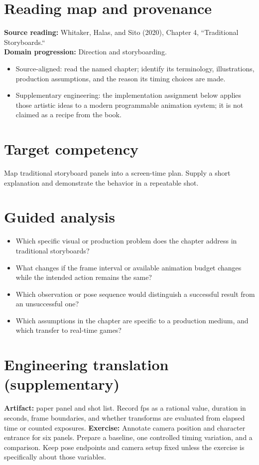 \documentclass[10pt,letterpaper]{article}
\begin{document}
\makedoctitle
\makedocsummary

\section{Reading map and provenance}
\textbf{Source reading:} Whitaker, Halas, and Sito (2020), Chapter 4, ``Traditional Storyboards.``\\
\textbf{Domain progression:} Direction and storyboarding.
\begin{itemize}
\item Source-aligned: read the named chapter; identify its terminology, illustrations, production assumptions, and the reason its timing choices are made.
\item Supplementary engineering: the implementation assignment below applies those artistic ideas to a modern programmable animation system; it is not claimed as a recipe from the book.
\end{itemize}
\section{Target competency}
Map traditional storyboard panels into a screen-time plan. Supply a short explanation and demonstrate the behavior in a repeatable shot.
\section{Guided analysis}
\begin{itemize}
\item Which specific visual or production problem does the chapter address in traditional storyboards?
\item What changes if the frame interval or available animation budget changes while the intended action remains the same?
\item Which observation or pose sequence would distinguish a successful result from an unsuccessful one?
\item Which assumptions in the chapter are specific to a production medium, and which transfer to real-time games?
\end{itemize}
\section{Engineering translation (supplementary)}
\textbf{Artifact:} paper panel and shot list. Record fps as a rational value, duration in seconds, frame boundaries, and whether transforms are evaluated from elapsed time or counted exposures.
\textbf{Exercise:} Annotate camera position and character entrance for six panels. Prepare a baseline, one controlled timing variation, and a comparison. Keep pose endpoints and camera setup fixed unless the exercise is specifically about those variables.
\end{document}
